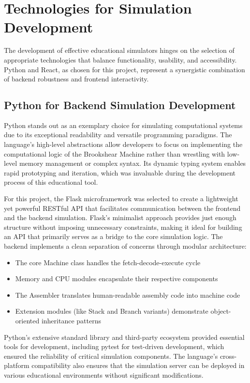 \section{Technologies for Simulation Development}

The development of effective educational simulators hinges on the selection of appropriate technologies that balance functionality, usability, and accessibility. Python and React, as chosen for this project, represent a synergistic combination of backend robustness and frontend interactivity.

\subsection{\textbf{Python for Backend Simulation Development}}

Python stands out as an exemplary choice for simulating computational systems due to its exceptional readability and versatile programming paradigms. The language's high-level abstractions allow developers to focus on implementing the computational logic of the Brookshear Machine rather than wrestling with low-level memory management or complex syntax. Its dynamic typing system enables rapid prototyping and iteration, which was invaluable during the development process of this educational tool.

For this project, the Flask microframework was selected to create a lightweight yet powerful RESTful API that facilitates communication between the frontend and the backend simulation. Flask's minimalist approach provides just enough structure without imposing unnecessary constraints, making it ideal for building an API that primarily serves as a bridge to the core simulation logic. The backend implements a clean separation of concerns through modular architecture:

\begin{itemize}
    \item The core Machine class handles the fetch-decode-execute cycle
    \item Memory and CPU modules encapsulate their respective components
    \item The Assembler translates human-readable assembly code into machine code
    \item Extension modules (like Stack and Branch variants) demonstrate object-oriented inheritance patterns
\end{itemize}

Python's extensive standard library and third-party ecosystem provided essential tools for development, including pytest for test-driven development, which ensured the reliability of critical simulation components. The language's cross-platform compatibility also ensures that the simulation server can be deployed in various educational environments without significant modifications.

